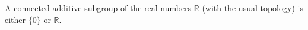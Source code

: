 A connected additive subgroup of the real numbers $\mathbb{R}$ (with the usual topology) is either $\{0\}$ or $\mathbb{R}$.
